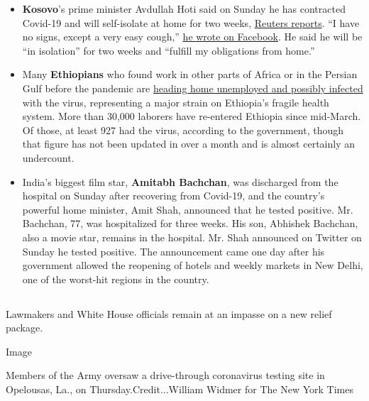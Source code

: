 \begin{itemize}
\item
  \textbf{Kosovo}'s prime minister Avdullah Hoti said on Sunday he has
  contracted Covid-19 and will self-isolate at home for two weeks,
  \href{https://www.reuters.com/article/us-health-coronavirus-kosovo-primeminist/kosovo-prime-minister-says-he-has-covid-19-idUSKBN24Y0ON}{Reuters
  reports}. ``I have no signs, except a very easy cough,''
  \href{https://www.facebookcorewwwi.onion/avdullah.hoti/posts/3508635622531100}{he
  wrote on Facebook}. He said he will be ``in isolation'' for two weeks
  and ``fulfill my obligations from home.''
\item
  Many \textbf{Ethiopians} who found work in other parts of Africa or in
  the Persian Gulf before the pandemic are
  \href{https://www.nytimes3xbfgragh.onion/2020/08/01/world/africa/ethiopian-migrant-workers-coronavirus.html?action=click\&module=RelatedLinks\&pgtype=Article}{heading
  home unemployed and possibly infected} with the virus, representing a
  major strain on Ethiopia's fragile health system. More than 30,000
  laborers have re-entered Ethiopia since mid-March. Of those, at least
  927 had the virus, according to the government, though that figure has
  not been updated in over a month and is almost certainly an
  undercount.
\item
  India's biggest film star, \textbf{Amitabh Bachchan}, was discharged
  from the hospital on Sunday after recovering from Covid-19, and the
  country's powerful home minister, Amit Shah, announced that he tested
  positive. Mr. Bachchan, 77, was hospitalized for three weeks. His son,
  Abhishek Bachchan, also a movie star, remains in the hospital. Mr.
  Shah announced on Twitter on Sunday he tested positive. The
  announcement came one day after his government allowed the reopening
  of hotels and weekly markets in New Delhi, one of the worst-hit
  regions in the country.
\end{itemize}

\hypertarget{-4}{%
\subsection{}\label{-4}}

Lawmakers and White House officials remain at an impasse on a new relief
package.

Image

Members of the Army oversaw a drive-through coronavirus testing site in
Opelousas, La., on Thursday.Credit...William Widmer for The New York
Times


